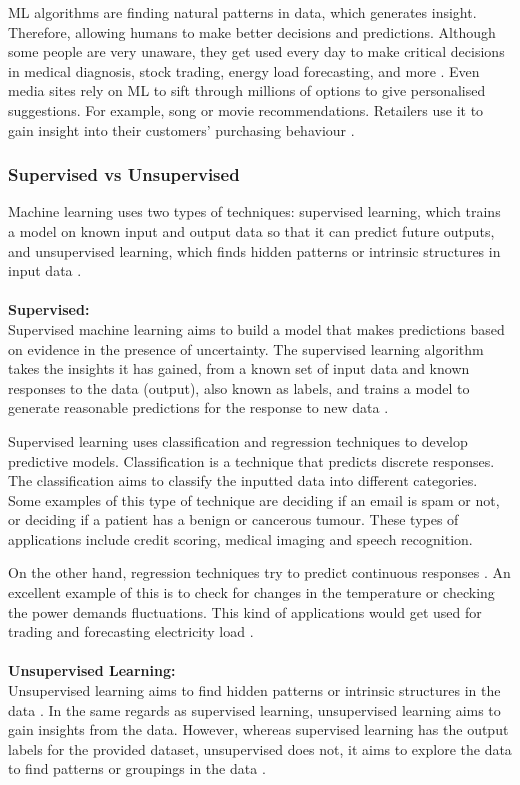 \documentclass[a4paper,10pt]{article}
\begin{document}
ML algorithms are finding natural patterns in data, which generates insight. Therefore, allowing humans to make better decisions and predictions. Although some people are very unaware, they get used every day to make critical decisions in medical diagnosis, stock trading, energy load forecasting, and more \cite{matlanintrotoml}. Even media sites rely on ML to sift through millions of options to give personalised suggestions. For example, song or movie recommendations. Retailers use it to gain insight into their customers' purchasing behaviour \cite{matlanintrotoml}.

\subsubsection{Supervised vs Unsupervised}
Machine learning uses two types of techniques: supervised learning, which trains a model on known input and output data so that it can predict future outputs, and unsupervised learning, which finds hidden patterns or intrinsic structures in input data \cite{geron2019hands}. \\
 \\
\textbf{Supervised:} \\
Supervised machine learning aims to build a model that makes predictions based on evidence in the presence of uncertainty. The supervised learning algorithm takes the insights it has gained, from a known set of input data and known responses to the data (output), also known as labels, and trains a model to generate reasonable predictions for the response to new data \cite{matlanintrotoml, geron2019hands}. 

Supervised learning uses classification and regression techniques to develop predictive models. Classification is a technique that predicts discrete responses. The classification aims to classify the inputted data into different categories\cite{matlanintrotoml}. Some examples of this type of technique are deciding if an email is spam or not, or deciding if a patient has a benign or cancerous tumour. These types of applications include credit scoring, medical imaging and speech recognition.

On the other hand, regression techniques try to predict continuous responses \cite{geron2019hands}. An excellent example of this is to check for changes in the temperature or checking the power demands fluctuations. This kind of applications would get used for trading and forecasting electricity load \cite{matlanintrotoml}. \\
 \\
\textbf{Unsupervised Learning:} \\
Unsupervised learning aims to find hidden patterns or intrinsic structures in the data \cite{geron2019hands}. In the same regards as supervised learning, unsupervised learning aims to gain insights from the data. However, whereas supervised learning has the output labels for the provided dataset, unsupervised does not, it aims to explore the data to find patterns or groupings in the data \cite{matlanintrotoml}.
\end{document}
